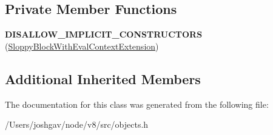 \subsection*{Private Member Functions}
\begin{DoxyCompactItemize}
\item 
{\bfseries D\+I\+S\+A\+L\+L\+O\+W\+\_\+\+I\+M\+P\+L\+I\+C\+I\+T\+\_\+\+C\+O\+N\+S\+T\+R\+U\+C\+T\+O\+RS} (\hyperlink{classv8_1_1internal_1_1_sloppy_block_with_eval_context_extension}{Sloppy\+Block\+With\+Eval\+Context\+Extension})\hypertarget{classv8_1_1internal_1_1_sloppy_block_with_eval_context_extension_a19308f888813ff1651bec0039d70a2b6}{}\label{classv8_1_1internal_1_1_sloppy_block_with_eval_context_extension_a19308f888813ff1651bec0039d70a2b6}

\end{DoxyCompactItemize}
\subsection*{Additional Inherited Members}


The documentation for this class was generated from the following file\+:\begin{DoxyCompactItemize}
\item 
/\+Users/joshgav/node/v8/src/objects.\+h\end{DoxyCompactItemize}
